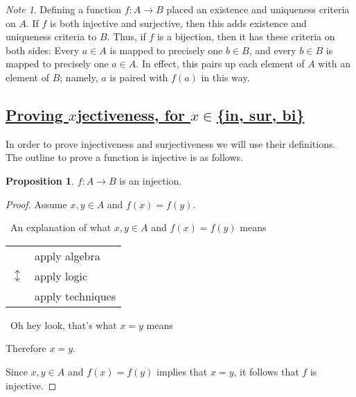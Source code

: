 \documentclass{amsart}
\theoremstyle{definition}
\theoremstyle{definition}
\newtheorem*{prpn}{Proposition}
\theoremstyle{remark}
\newtheorem*{note}{Note}
\begin{document}
\begin{note}
      Defining a function $f:A\rightarrow B$ placed an existence and uniqueness criteria on $A$. If $f$ is both injective and surjective, then this adds existence and uniqueness criteria to $B$. Thus, if $f$ is a bijection, then it has these criteria on both sides: Every $a \in A$ is mapped to precisely one $b \in B$, and every $b\in B$ is mapped to precisely one $a \in A$. In effect, this pairs up each element of $A$ with an element of $B$; namely, $a$ is paired with $f(a)$ in this way.
\end{note}













\bigskip \bigskip

\subsection{\underline{Proving $x$jectiveness, for $x\in$\{in, sur, bi\}}}\hspace*{\fill}

In order to prove injectiveness and surjectiveness we will use their definitions. The outline to prove a function is injective is as follows.

\begin{prpn}
      $f:A\rightarrow B$ is an injection.
\end{prpn}

\begin{proof}
      Assume $x,y\in A$ and $f(x)=f(y)$.

      \begin{center}
            \guillemotleft\ An explanation of what $x,y\in A$ and $f(x)=f(y)$ means \guillemotright
      \end{center}

            \begin{center}
            \begin{tabular}{r l}
                  \multirow{3}{*}{\huge $\updownarrow$} & apply algebra \\
                  & apply logic \\
                  & apply techniques \\
            \end{tabular}
            \end{center}

            \begin{center}
                  \guillemotleft\ Oh hey look, that's what $x=y$ means \guillemotright
            \end{center}

            Therefore $x = y$.

            Since $x,y\in A$ and $f(x)=f(y)$ implies that $x = y$, it follows that $f$ is injective.

\end{proof}
\end{document}
